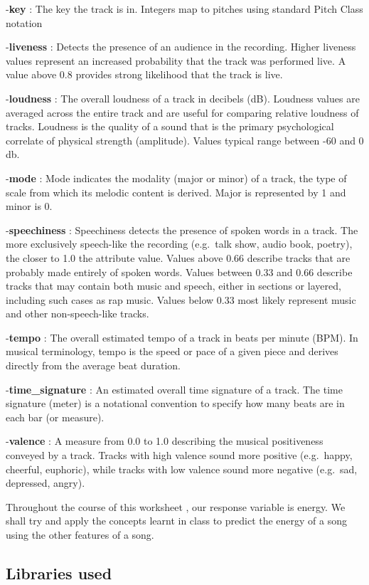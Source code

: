 \documentclass[
]{article}
\begin{document}
-\textbf{key} : The key the track is in. Integers map to pitches using
standard Pitch Class notation

-\textbf{liveness} : Detects the presence of an audience in the
recording. Higher liveness values represent an increased probability
that the track was performed live. A value above 0.8 provides strong
likelihood that the track is live.

-\textbf{loudness} : The overall loudness of a track in decibels (dB).
Loudness values are averaged across the entire track and are useful for
comparing relative loudness of tracks. Loudness is the quality of a
sound that is the primary psychological correlate of physical strength
(amplitude). Values typical range between -60 and 0 db.

-\textbf{mode} : Mode indicates the modality (major or minor) of a
track, the type of scale from which its melodic content is derived.
Major is represented by 1 and minor is 0.

-\textbf{speechiness} : Speechiness detects the presence of spoken words
in a track. The more exclusively speech-like the recording (e.g.~talk
show, audio book, poetry), the closer to 1.0 the attribute value. Values
above 0.66 describe tracks that are probably made entirely of spoken
words. Values between 0.33 and 0.66 describe tracks that may contain
both music and speech, either in sections or layered, including such
cases as rap music. Values below 0.33 most likely represent music and
other non-speech-like tracks.

-\textbf{tempo} : The overall estimated tempo of a track in beats per
minute (BPM). In musical terminology, tempo is the speed or pace of a
given piece and derives directly from the average beat duration.

-\textbf{time\_signature} : An estimated overall time signature of a
track. The time signature (meter) is a notational convention to specify
how many beats are in each bar (or measure).

-\textbf{valence} : A measure from 0.0 to 1.0 describing the musical
positiveness conveyed by a track. Tracks with high valence sound more
positive (e.g.~happy, cheerful, euphoric), while tracks with low valence
sound more negative (e.g.~sad, depressed, angry).

Throughout the course of this worksheet , our response variable is
energy. We shall try and apply the concepts learnt in class to predict
the energy of a song using the other features of a song.

\hypertarget{libraries-used}{%
\subsection{Libraries used}\label{libraries-used}}
\end{document}
